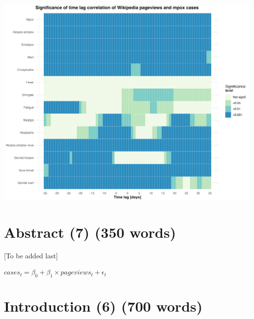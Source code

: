 \documentclass[
  12pt,
]{article}
\begin{document}
\begin{center}
\includegraphics{images/spearman-pvalues-heatmap.png}
\end{center}

\section{Abstract (7) (350 words)}\label{abstract-7-350-words}

{[}To be added last{]}

\(cases_t = \beta_0 + \beta_1 \times pageviews_t + \epsilon_t\)

\section{Introduction (6) (700 words)}\label{introduction-6-700-words}
\end{document}
